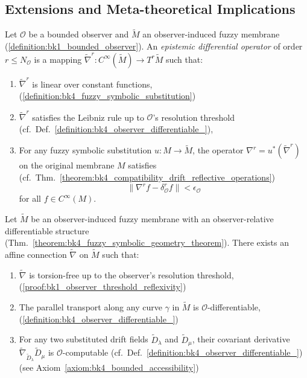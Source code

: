 \subsection{Extensions and Meta-theoretical Implications} \label{subsec:bk4_extensions_meta_theoretical_implications}
\begin{definition} \label{definition:bk4_epistemic_differential_o}
Let $\mathcal{O}$ be a bounded observer and $\tilde{M}$ an observer-induced fuzzy membrane (\ref{definition:bk1_bounded_observer}). An \emph{epistemic differential operator} of order $r \leq N_\mathcal{O}$ is a mapping $\tilde{\nabla}^r: C^\infty(\tilde{M}) \to T^r\tilde{M}$ such that:
\begin{enumerate}
\item $\tilde{\nabla}^r$ is linear over constant functions, (\ref{definition:bk4_fuzzy_symbolic_substitution})
\item $\tilde{\nabla}^r$ satisfies the Leibniz rule up to $\mathcal{O}$'s resolution threshold (cf.~Def.~\ref{definition:bk4_observer_differentiable_}),
\item For any fuzzy symbolic substitution $u: M \to \tilde{M}$, the operator $\nabla^r = u^*(\tilde{\nabla}^r)$ on the original membrane $M$ satisfies (cf.~Thm.~\ref{theorem:bk4_compatibility_drift_reflective_operations})
    \[
    \|\nabla^r f - \delta^r_\mathcal{O} f\| < \epsilon_\mathcal{O}
    \]
    for all $f \in C^\infty(M)$.
\end{enumerate}
\end{definition}
\begin{proposition}
\label{proposition:bk4_fuzzy_connection} 
Let $\tilde{M}$ be an observer-induced fuzzy membrane with an observer-relative differentiable structure (Thm.~\ref{theorem:bk4_fuzzy_symbolic_geometry_theorem}). There exists an affine connection $\tilde{\nabla}$ on $\tilde{M}$ such that:
\begin{enumerate}
\item $\tilde{\nabla}$ is torsion-free up to the observer's resolution threshold, (\ref{proof:bk1_observer_threshold_reflexivity})
\item The parallel transport along any curve $\gamma$ in $\tilde{M}$ is $\mathcal{O}$-differentiable, (\ref{definition:bk4_observer_differentiable_})
\item For any two substituted drift fields $\tilde{D}_\lambda$ and $\tilde{D}_\mu$, their covariant derivative $\tilde{\nabla}_{\tilde{D}_\lambda}\tilde{D}_\mu$ is $\mathcal{O}$-computable (cf.~Def.~\ref{definition:bk4_observer_differentiable_}) (see Axiom~\ref{axiom:bk4_bounded_accessibility})
\end{enumerate}
\end{proposition}
